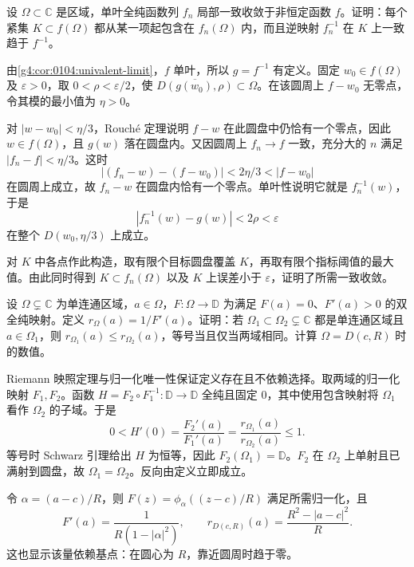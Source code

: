 \begin{exercise}
	\label{g4:ex:0101:degenerate-limits}
	设 \(\Omega\subset\mathbb C\) 是区域，单叶全纯函数列 \(f_n\) 局部一致收敛于非恒定函数 \(f\)。证明：每个紧集 \(K\subset f(\Omega)\) 都从某一项起包含在 \(f_n(\Omega)\) 内，而且逆映射 \(f_n^{-1}\) 在 \(K\) 上一致趋于 \(f^{-1}\)。
\end{exercise}
\begin{solution}
	由\cref{g4:cor:0104:univalent-limit}，\(f\) 单叶，所以 \(g=f^{-1}\) 有定义。固定 \(w_0\in f(\Omega)\) 及 \(\varepsilon>0\)，取 \(0<\rho<\varepsilon/2\)，使 \(\overline{D(g(w_0),\rho)}\subset\Omega\)。在该圆周上 \(f-w_0\) 无零点，令其模的最小值为 \(\eta>0\)。

	对 \(|w-w_0|<\eta/3\)，Rouché 定理说明 \(f-w\) 在此圆盘中仍恰有一个零点，因此 \(w\in f(\Omega)\)，且 \(g(w)\) 落在圆盘内。又因圆周上 \(f_n\to f\) 一致，充分大的 \(n\) 满足 \(|f_n-f|<\eta/3\)。这时
	\[
		|(f_n-w)-(f-w_0)|<2\eta/3<|f-w_0|
	\]
	在圆周上成立，故 \(f_n-w\) 在圆盘内恰有一个零点。单叶性说明它就是 \(f_n^{-1}(w)\)，于是
	\[
		|f_n^{-1}(w)-g(w)|<2\rho<\varepsilon
	\]
	在整个 \(D(w_0,\eta/3)\) 上成立。

	对 \(K\) 中各点作此构造，取有限个目标圆盘覆盖 \(K\)，再取有限个指标阈值的最大值。由此同时得到 \(K\subset f_n(\Omega)\) 以及 \(K\) 上误差小于 \(\varepsilon\)，证明了所需一致收敛。
\end{solution}

\begin{exercise}
	\label{g4:ex:0101:conformal-radius}
	设 \(\Omega\subsetneq\mathbb C\) 为单连通区域，\(a\in\Omega\)，\(F:\Omega\to\mathbb D\) 为满足 \(F(a)=0\)、\(F'(a)>0\) 的双全纯映射。定义 \(r_\Omega(a)=1/F'(a)\)。证明：若 \(\Omega_1\subset\Omega_2\subsetneq\mathbb C\) 都是单连通区域且 \(a\in\Omega_1\)，则 \(r_{\Omega_1}(a)\le r_{\Omega_2}(a)\)，等号当且仅当两域相同。计算 \(\Omega=D(c,R)\) 时的数值。
\end{exercise}
\begin{solution}
	Riemann 映照定理与归一化唯一性保证定义存在且不依赖选择。取两域的归一化映射 \(F_1,F_2\)。函数 \(H=F_2\circ F_1^{-1}:\mathbb D\to\mathbb D\) 全纯且固定 \(0\)，其中使用包含映射将 \(\Omega_1\) 看作 \(\Omega_2\) 的子域。于是
	\[
		0<H'(0)=\frac{F_2'(a)}{F_1'(a)}
		=\frac{r_{\Omega_1}(a)}{r_{\Omega_2}(a)}\le1.
	\]
	等号时 Schwarz 引理给出 \(H\) 为恒等，因此 \(F_2(\Omega_1)=\mathbb D\)。\(F_2\) 在 \(\Omega_2\) 上单射且已满射到圆盘，故 \(\Omega_1=\Omega_2\)。反向由定义立即成立。

	令 \(\alpha=(a-c)/R\)，则 \(F(z)=\phi_\alpha((z-c)/R)\) 满足所需归一化，且
	\[
		F'(a)=\frac1{R(1-|\alpha|^2)},\qquad
		r_{D(c,R)}(a)=\frac{R^2-|a-c|^2}{R}.
	\]
	这也显示该量依赖基点：在圆心为 \(R\)，靠近圆周时趋于零。
\end{solution}

